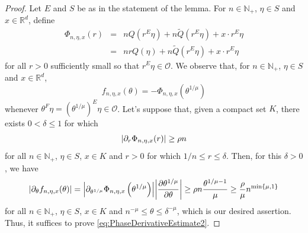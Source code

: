 \documentclass[11pt, letter]{book}
\newcommand{\p}{\partial}
\newcommand{\f}[2]{\frac{#1}{#2}}
\begin{document}
\begin{proof}
Let $E$ and $S$ be as in the statement of the lemma. For $n\in\mathbb{N}_+$, $\eta\in S$ and $x\in \mathbb{R}^d$, define
\begin{eqnarray*}
\Phi_{n,\eta,x}(r)&=&nQ(r^E\eta)+n\widetilde{Q}(r^E\eta)+x\cdot r^E\eta\\
&=&nrQ(\eta)+n\widetilde{Q}(r^E\eta)+x\cdot r^E\eta
\end{eqnarray*}
for all $r>0$ sufficiently small so that $r^E\eta\in \mathcal{O}$.  We observe that, for $n\in\mathbb{N}_+$, $\eta\in S$ and $x\in\mathbb{R}^d$, 
\begin{equation*}
f_{n,\eta,x}(\theta)=-\Phi_{n,\eta,x}\left(\theta^{1/\mu}\right)
\end{equation*}
whenever $\theta^F\eta=(\theta^{1/\mu})^E\eta\in \mathcal{O}$. Let's suppose that, given a compact set $K$, there exists $0<\delta\leq 1$ for which
\begin{equation}\label{eq:PhaseDerivativeEstimate2}
\abs{\partial_r \Phi_{n,\eta,x}(r)}\geq\rho n
\end{equation}
for all $n\in\mathbb{N}_+$, $\eta\in S$, $x\in K$ and $r>0$ for which $1/n\leq r\leq \delta$. Then, for this $\delta>0$, we have
\begin{equation*}
    \abs{\p_\theta f_{n,\eta,x} (\theta)} = 
     \abs{  \p_{\theta^{1/\mu}} \Phi_{n,\eta,x}\left(\theta^{1/\mu}\right)}
     \abs{ \f{\p \theta^{1/\mu}}{\p \theta}} 
     \geq 
    \rho n\f{\theta^{1/\mu - 1}  }{\mu}  \geq \f{\rho}{\mu}n^{\min\{\mu,1 \}}
\end{equation*}
for all $n\in\mathbb{N}_+$, $\eta\in S$, $x\in K$ and $n^{-\mu}\leq \theta\leq \delta^{-\mu}$, which is our desired assertion. Thus, it suffices to prove \eqref{eq:PhaseDerivativeEstimate2}.



\end{proof}
\end{document}

